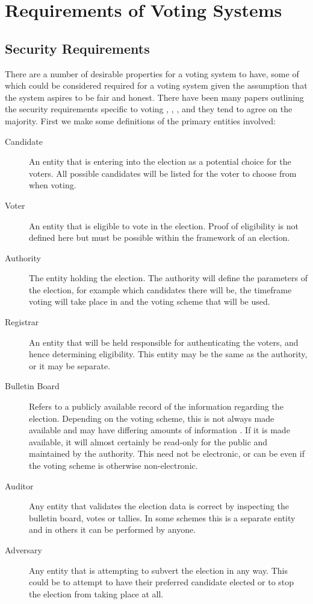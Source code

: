 
\chapter{Requirements of Voting Systems}
\label{ch:req}

\section{Security Requirements}
\label{ch:req:sec}

There are a number of desirable properties for a voting system to have, some of which could be considered required for a voting system given the assumption that the system aspires to be fair and honest. There have been many papers outlining the security requirements specific to voting \cite{epstein_electronic_2007}, \cite{delaune_formalising_2010}, \cite{li_taxonomy_2014}, and they tend to agree on the majority. First we make some definitions of the primary entities involved:

\begin{description}
    \item[Candidate] An entity that is entering into the election as a potential choice for the voters. All possible candidates will be listed for the voter to choose from when voting.
    \item[Voter] An entity that is eligible to vote in the election. Proof of eligibility is not defined here but must be possible within the framework of an election.
    \item[Authority] The entity holding the election. The authority will define the parameters of the election, for example which candidates there will be, the timeframe voting will take place in and the voting scheme that will be used.
    \item[Registrar] An entity that will be held responsible for authenticating the voters, and hence determining eligibility. This entity may be the same as the authority, or it may be separate.
    \item[Bulletin Board] Refers to a publicly available record of the information regarding the election. Depending on the voting scheme, this is not always made available and may have differing amounts of information . If it is made available, it will almost certainly be read-only for the public and maintained by the authority. This need not be electronic, or can be even if the voting scheme is otherwise non-electronic.
    \item[Auditor] Any entity that validates the election data is correct by inspecting the bulletin board, votes or tallies. In some schemes this is a separate entity  and in others  it can be performed by anyone.
    \item[Adversary] Any entity that is attempting to subvert the election in any way. This could be to attempt to have their preferred candidate elected or to stop the election from taking place at all.
\end{description}

